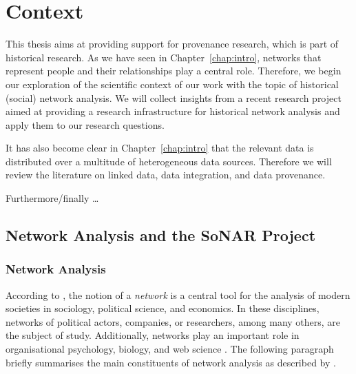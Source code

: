 \chapter{Context}
\label{chap:rel_work}
\label{chap:context}

This thesis aims at providing support for provenance research, which is part of historical research.
As we have seen in Chapter~\ref{chap:intro}, networks that represent
people and their relationships play a central role.
Therefore, we begin our exploration of the scientific context of our work
with the topic of historical (social) network analysis.
We will collect insights from a recent research project
aimed at providing a research infrastructure for historical network analysis
and apply them to our research questions.

It has also become clear in Chapter~\ref{chap:intro} that the relevant data is distributed 
over a multitude of heterogeneous data sources.
Therefore we will review the literature on linked data, data integration,
and data provenance.

Furthermore/finally \dots


\section{Network Analysis and the SoNAR Project}
\label{sec:HNA+SoNAR}


\subsection{Network Analysis}

According to \textcite{Jansen2003},
the notion of a \emph{network} is a central tool for the analysis
of modern societies in sociology, political science, and economics.
In these disciplines, networks of political actors, companies, or researchers,
among many others, are the subject of study.
Additionally, networks play an important role
in organisational psychology, biology, and web science \autocite{WikiSNAGerman,WikiNetworkAnalysis}.
The following
paragraph briefly summarises the main constituents of network analysis
as described by \textcite{Jansen2003}.

